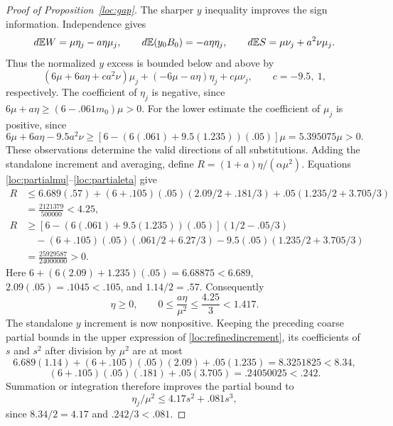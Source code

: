 \begin{proof}[Proof of Proposition~\ref{loc:gap}]
The sharper $y$ inequality improves the sign information.
Independence gives
\[
 d\mathbb E W=\mu\eta_j-a\eta\mu_j,\qquad
 d\mathbb E(y_0B_0)=-a\eta\eta_j,\qquad
 d\mathbb E S=\mu\nu_j+a^2\nu\mu_j.
\]
Thus the normalized $y$ excess is bounded below and above by
\begin{equation}\label{loc:refinedincrement}
 (6\mu+6a\eta+c a^2\nu)\mu_j
 +(-6\mu-a\eta)\eta_j+c\mu\nu_j,
 \qquad c=-9.5,\ 1,
\end{equation}
respectively.  The coefficient of $\eta_j$ is negative, since
$6\mu+a\eta\ge(6-.061m_0)\mu>0$.
For the lower estimate the coefficient of $\mu_j$ is positive, since
\[
 6\mu+6a\eta-9.5a^2\nu
 \ge[6-(6(.061)+9.5(1.235))(.05)]\mu
 =5.395075\mu>0.
\]
These observations determine the valid directions of all substitutions.
Adding the standalone increment and averaging, define
$R=(1+a)\eta/(\alpha\mu^2)$.  Equations
\eqref{loc:partialmu}--\eqref{loc:partialeta} give
\begin{align*}
 R&\le6.689(.57)+(6+.105)(.05)(2.09/2+.181/3)
       +.05(1.235/2+3.705/3)\\
  &=\frac{2121379}{500000}<4.25,\\
 R&\ge[6-(6(.061)+9.5(1.235))(.05)](1/2-.05/3)\\
 &\hspace{1em}-(6+.105)(.05)(.061/2+6.27/3)
       -9.5(.05)(1.235/2+3.705/3)\\
  &=\frac{25929587}{24000000}>0.
\end{align*}
Here $6+(6(2.09)+1.235)(.05)=6.68875<6.689$,
$2.09(.05)=.1045<.105$, and $1.14/2=.57$.
Consequently
\begin{equation}\label{loc:etapositive}
 \eta\ge0,\qquad 0\le\frac{a\eta}{\mu^2}
       \le\frac{4.25}{3}<1.417.
\end{equation}
The standalone $y$ increment is now nonpositive.  Keeping the preceding
coarse partial bounds in the upper expression of
\eqref{loc:refinedincrement}, its coefficients of $s$ and $s^2$ after
division by $\mu^2$ are at most
\[
 6.689(1.14)+(6+.105)(.05)(2.09)+.05(1.235)
   =8.3251825<8.34,
\]
\[
 (6+.105)(.05)(.181)+.05(3.705)=.24050025<.242.
\]
Summation or integration therefore improves the partial bound to
\begin{equation}\label{loc:etaimproved}
 \eta_j/\mu^2\le4.17s^2+.081s^3,
\end{equation}
since $8.34/2=4.17$ and $.242/3<.081$.


\end{proof}
